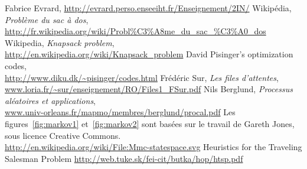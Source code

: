   Fabrice Evrard, \url{http://evrard.perso.enseeiht.fr/Enseignement/2IN/}
  Wikipédia, \emph{Problème du sac à dos},\\
  \url{http://fr.wikipedia.org/wiki/Probl\%C3\%A8me_du_sac_\%C3\%A0_dos}
  Wikipedia, \emph{Knapsack problem},\\
  \url{http://en.wikipedia.org/wiki/Knapsack_problem}
  David Pisinger's optimization codes,\\
  \url{http://www.diku.dk/~pisinger/codes.html}
  Frédéric Sur, \emph{Les files d'attentes}, \\
  \url{www.loria.fr/~sur/enseignement/RO/Files1_FSur.pdf}
  Nils Berglund, \emph{Processus aléatoires et applications}, \\
  \url{www.univ-orleans.fr/mapmo/membres/berglund/procal.pdf}
  Les figures~\ref{fig:markov1} et~\ref{fig:markov2} sont basées sur le travail
  de Gareth Jones, sous licence Creative Commons.\\
  \url{http://en.wikipedia.org/wiki/File:Mmc-statespace.svg}
   Heuristics for the Traveling Salesman Problem
   \url{http://web.tuke.sk/fei-cit/butka/hop/htsp.pdf}
